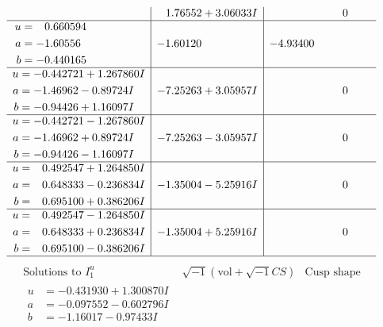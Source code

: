 \documentclass[1p]{elsarticle_modified}
\theoremstyle{definition}
\newcommand{\I}{\sqrt{-1}}
\begin{document}
$$\begin{array}{c|c|c}
 & \phantom{-}1.76552 + 3.06033 I & \phantom{-0.000000 } 0 \\ \hline\begin{aligned}
u &= \phantom{-}0.660594\phantom{ +0.000000I} \\
a &= -1.60556\phantom{ +0.000000I} \\
b &= -0.440165\phantom{ +0.000000I}\end{aligned}
 & -1.60120\phantom{ +0.000000I} & -4.93400\phantom{ +0.000000I} \\ \hline\begin{aligned}
u &= -0.442721 + 1.267860 I \\
a &= -1.46962 - 0.89724 I \\
b &= -0.94426 + 1.16097 I\end{aligned}
 & -7.25263 + 3.05957 I & \phantom{-0.000000 } 0 \\ \hline\begin{aligned}
u &= -0.442721 - 1.267860 I \\
a &= -1.46962 + 0.89724 I \\
b &= -0.94426 - 1.16097 I\end{aligned}
 & -7.25263 - 3.05957 I & \phantom{-0.000000 } 0 \\ \hline\begin{aligned}
u &= \phantom{-}0.492547 + 1.264850 I \\
a &= \phantom{-}0.648333 - 0.236834 I \\
b &= \phantom{-}0.695100 + 0.386206 I\end{aligned}
 & -1.35004 - 5.25916 I & \phantom{-0.000000 } 0 \\ \hline\begin{aligned}
u &= \phantom{-}0.492547 - 1.264850 I \\
a &= \phantom{-}0.648333 + 0.236834 I \\
b &= \phantom{-}0.695100 - 0.386206 I\end{aligned}
 & -1.35004 + 5.25916 I & \phantom{-0.000000 } 0\\
 \hline 
 \end{array}$$\newpage$$\begin{array}{c|c|c}  
\text{Solutions to }I^u_{1}& \I (\text{vol} + \sqrt{-1}CS) & \text{Cusp shape}\\
 \hline 
\begin{aligned}
u &= -0.431930 + 1.300870 I \\
a &= -0.097552 - 0.602796 I \\
b &= -1.16017 - 0.97433 I\end{aligned}

\end{array}$$
\end{document}
